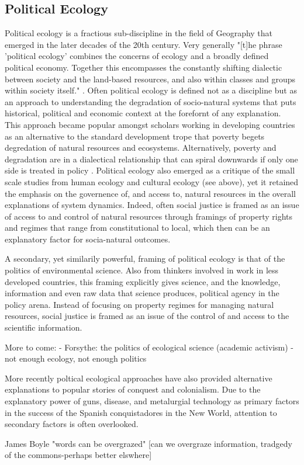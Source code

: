 \subsection{Political Ecology}

Political ecology is a fractious sub-discipline in the field of Geography that emerged in the later decades of the 20th century. Very generally "[t]he phrase 'political ecology' combines the concerns of ecology and a broadly defined political economy. Together this encompasses the constantly shifting dialectic between society and the land-based resources, and also within classes and groups within society itself." \citep[][p. 17]{blaikie_1987}. Often political ecology is defined not as a discipline but as an approach to understanding the degradation of socio-natural systems that puts historical, political and economic context at the forefornt of any explanation. This approach became popular amongst scholars working in developing countries as an alternative to the standard development trope that poverty begets degredation of natural resources and ecosystems. Alternatively, poverty and degradation are in a dialectical relationship that can spiral downwards if only one side is treated in policy \citep{blaikie_1987, peet_1996}. Political ecology also emerged as a critique of the small scale studies from human ecology and cultural ecology (see above), yet it retained the emphasis on the governence of, and access to, natural resources in the overall explanations of system dynamics. Indeed, often social justice is framed as an issue of access to and control of natural resources  through framings of property rights and regimes that range from constitutional to local, which then can be an explanatory factor for socia-natural outcomes.

A secondary, yet similarily powerful, framing of political ecology is that of the politics of environmental science. Also from thinkers involved in work in less developed countries, this framing explicitly gives science, and the knowledge, information and even raw data that science produces, political agency in the policy arena. Instead of focusing on property regimes for managing natural resources, social justice is framed as an issue of the control of and access to the scientific information. 

More to come:
- Forsythe: the politics of ecological science (academic activism) \citep{forsyth_2003,huxley_1974}
- not enough ecology, not enough politics \citep{walker_2005,walker_2007}


More recently poltical ecological approaches have also provided alternative explanations to popular stories of conquest and colonialism. Due to the explanatory power of guns, disease, and metalurgial technology as primary factors in the success of the Spanish conquistadores in the New World, attention to secondary factors is often overlooked. 

James Boyle "words can be overgrazed" [can we overgraze information, tradgedy of the commons-perhaps better elswhere]
